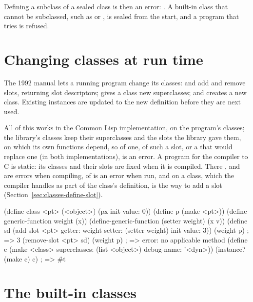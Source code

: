 \noindent Defining a subclass of a sealed class is then an error:
. A built-in class that
cannot be subclassed, such as  or , is
sealed from the start, and a program that tries is refused.

\section{Changing classes at run time}\label{sec:classes-dynamic}

The 1992 manual lets a running program change its classes: 
and  add and remove slots, returning slot descriptors;
 gives a class
new superclasses; and  creates a new class. Existing instances are
updated to the new definition before they are next used.

All of this works in the Common Lisp implementation, on the program's
classes; the library's classes keep their superclasses and the slots the
library gave them, on which its own functions depend, so
 of one,  of
such a slot, or a  that would replace one (in both
implementations), is an error. A program for the
compiler to C is static: its classes and their slots are fixed when it is
compiled. There ,  and
 are errors when compiling,  of  is an error when run, and
 on a class, which the compiler handles as part of the
class's definition, is the way to add a slot (Section~\ref{sec:classes-define-slot}).

\begin{dylan}
(define-class <pt> (<object>) (px init-value: 0))
(define p (make <pt>))
(define-generic-function weight (x))
(define-generic-function (setter weight) (x v))
(define sd (add-slot <pt> getter: weight setter: (setter weight)
                          init-value: 3))
(weight p)                     ; => 3
(remove-slot <pt> sd)
(weight p)                     ; => error: no applicable method
(define c (make <class> superclasses: (list <object>) debug-name: '<dyn>))
(instance? (make c) c)         ; => #t
\end{dylan}

\section{The built-in classes}\label{sec:classes-built-in}

